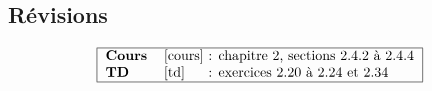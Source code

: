 \subsection{Révisions}

$$\begin{tabular}{|ll@{ : }l|}
\hline
\textbf{Cours} & \cite{cours} & chapitre 2, sections 2.4.2 à 2.4.4 \\
\textbf{TD}    & \cite{td}    & exercices 2.20 à 2.24 et 2.34 \\
\hline
\end{tabular}$$

